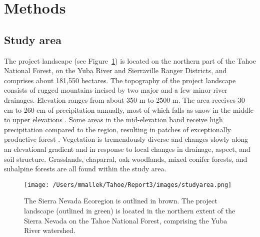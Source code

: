 
\section{Methods}

\subsection*{Study area}
The project landscape (see Figure~\ref{projectarea-ch3}) is located on the northern part of the Tahoe National Forest, on the Yuba River and Sierraville Ranger Districts, and comprises about 181,550 hectares. The topography of the project landscape consists of rugged mountains incised by two major and a few minor river drainages. Elevation ranges from about 350 m to 2500 m. The area receives 30 cm to 260 cm of precipitation annually, most of which falls as snow in the middle to upper elevations \citep{Storer1963}. Some areas in the mid-elevation band receive high precipitation compared to the region, resulting in patches of exceptionally productive forest \citep{Littell2012}. Vegetation is tremendously diverse and changes slowly along an elevational gradient and in response to local changes in drainage, aspect, and soil structure. Grasslands, chaparral, oak woodlands, mixed conifer forests, and subalpine forests are all found within the study area.

\begin{figure}
\centering
\texttt{[image: /Users/mmallek/Tahoe/Report3/images/studyarea.png]}
\caption{The Sierra Nevada Ecoregion is outlined in brown. The project landscape (outlined in green) is located in the northern extent of the Sierra Nevada on the Tahoe National Forest, comprising the Yuba River watershed.}
\label{projectarea-ch3}
\end{figure}

